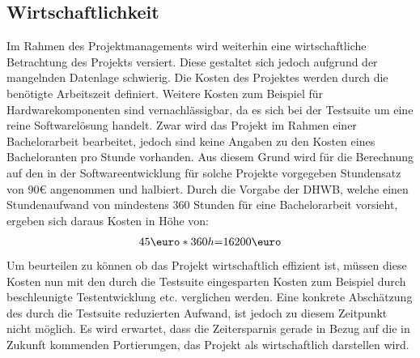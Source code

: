 \subsection{Wirtschaftlichkeit}
Im Rahmen des Projektmanagements wird weiterhin eine wirtschaftliche Betrachtung des Projekts versiert. Diese gestaltet sich jedoch aufgrund der mangelnden Datenlage schwierig. Die Kosten des Projektes werden durch die benötigte Arbeitszeit definiert. Weitere Kosten zum Beispiel für Hardwarekomponenten sind vernachlässigbar, da es sich bei der Testsuite um eine reine Softwarelösung handelt. Zwar wird das Projekt im Rahmen einer Bachelorarbeit bearbeitet, jedoch sind keine Angaben zu den Kosten eines Bacheloranten pro Stunde vorhanden. Aus diesem Grund wird für die Berechnung auf den in der Softwareentwicklung für solche Projekte vorgegeben Stundensatz von 90\euro{} angenommen und halbiert. Durch die Vorgabe der DHWB, welche einen Stundenaufwand von mindestens 360 Stunden für eine Bachelorarbeit vorsieht, ergeben sich daraus Kosten in Höhe von:
\begin{align*}
    45 \text{\euro} * 360 h {=} 16200 \text{\euro}
\end{align*}
Um beurteilen zu können ob das Projekt wirtschaftlich effizient ist, müssen diese Kosten nun mit den durch die Testsuite eingesparten Kosten zum Beispiel durch beschleunigte Testentwicklung etc. verglichen werden. Eine konkrete Abschätzung des durch die Testsuite reduzierten Aufwand, ist jedoch zu diesem Zeitpunkt nicht möglich. Es wird erwartet, dass die Zeitersparnis gerade in Bezug auf die in Zukunft kommenden Portierungen, das Projekt als wirtschaftlich darstellen wird. 




